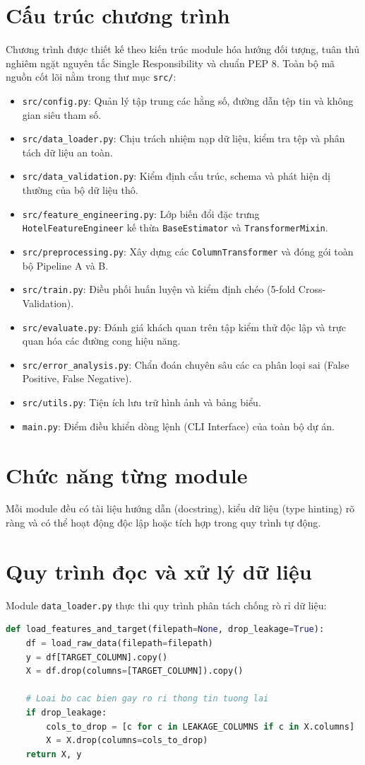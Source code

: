 \section{Cấu trúc chương trình}
Chương trình được thiết kế theo kiến trúc module hóa hướng đối tượng, tuân thủ nghiêm ngặt nguyên tắc Single Responsibility và chuẩn PEP 8. Toàn bộ mã nguồn cốt lõi nằm trong thư mục \texttt{src/}:
\begin{itemize}
    \item \texttt{src/config.py}: Quản lý tập trung các hằng số, đường dẫn tệp tin và không gian siêu tham số.
    \item \texttt{src/data\_loader.py}: Chịu trách nhiệm nạp dữ liệu, kiểm tra tệp và phân tách dữ liệu an toàn.
    \item \texttt{src/data\_validation.py}: Kiểm định cấu trúc, schema và phát hiện dị thường của bộ dữ liệu thô.
    \item \texttt{src/feature\_engineering.py}: Lớp biến đổi đặc trưng \texttt{HotelFeatureEngineer} kế thừa \texttt{BaseEstimator} và \texttt{TransformerMixin}.
    \item \texttt{src/preprocessing.py}: Xây dựng các \texttt{ColumnTransformer} và đóng gói toàn bộ Pipeline A và B.
    \item \texttt{src/train.py}: Điều phối huấn luyện và kiểm định chéo (5-fold Cross-Validation).
    \item \texttt{src/evaluate.py}: Đánh giá khách quan trên tập kiểm thử độc lập và trực quan hóa các đường cong hiệu năng.
    \item \texttt{src/error\_analysis.py}: Chẩn đoán chuyên sâu các ca phân loại sai (False Positive, False Negative).
    \item \texttt{src/utils.py}: Tiện ích lưu trữ hình ảnh và bảng biểu.
    \item \texttt{main.py}: Điểm điều khiển dòng lệnh (CLI Interface) của toàn bộ dự án.
\end{itemize}

\section{Chức năng từng module}
Mỗi module đều có tài liệu hướng dẫn (docstring), kiểu dữ liệu (type hinting) rõ ràng và có thể hoạt động độc lập hoặc tích hợp trong quy trình tự động.

\section{Quy trình đọc và xử lý dữ liệu}
Module \texttt{data\_loader.py} thực thi quy trình phân tách chống rò rỉ dữ liệu:
\begin{lstlisting}[language=Python]
def load_features_and_target(filepath=None, drop_leakage=True):
    df = load_raw_data(filepath=filepath)
    y = df[TARGET_COLUMN].copy()
    X = df.drop(columns=[TARGET_COLUMN]).copy()
    
    # Loai bo cac bien gay ro ri thong tin tuong lai
    if drop_leakage:
        cols_to_drop = [c for c in LEAKAGE_COLUMNS if c in X.columns]
        X = X.drop(columns=cols_to_drop)
    return X, y
\end{lstlisting}

